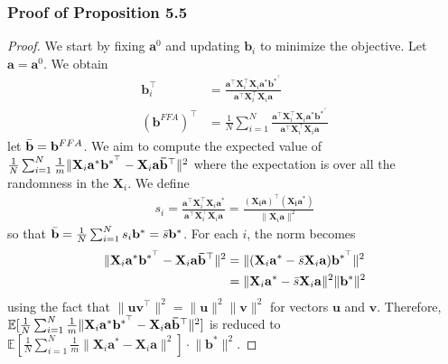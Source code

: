 \documentclass{article}
\theoremstyle{plain}
\theoremstyle{definition}
\theoremstyle{remark}
\begin{document}
\subsubsection{Proof of Proposition 5.5} \label{fa-heter-saturate}
\begin{proof}
    We start by fixing $\mathbf{a}^0$ and updating $\mathbf{b}_i$ to minimize the objective. Let $\mathbf{a}=\mathbf{a}^0$. We obtain
    \begin{align}
        \mathbf{b}_i^\top & = \frac{\mathbf{a}^\top \mathbf{X}_i^\top \mathbf{X}_i \mathbf{a}^* \mathbf{b}^{*^\top} }{\mathbf{a}^\top \mathbf{X}_i^\top\mathbf{X}_i \mathbf{a}} \\
        ({\mathbf{b}}^{FFA})^\top  & = \frac{1}{N} \sum_{i=1}^{N} \frac{\mathbf{a}^\top \mathbf{X}_i^\top \mathbf{X}_i \mathbf{a}^* \mathbf{b}^{*^\top} }{\mathbf{a}^\top \mathbf{X}_i^\top\mathbf{X}_i \mathbf{a}}
    \end{align}
   let $\Bar{\mathbf{b}}={\mathbf{b}}^{FFA}$. We aim to compute the expected value of $\frac{1}{N}\sum_{i=1}^{N}\frac{1}{m}\lVert \mathbf{X}_i \mathbf{a}^*\mathbf{b}^{*^{\top}}- \mathbf{X}_i \mathbf{a}\mathbf{\Bar{b}}^{\top}\rVert^2 $ where the expectation is over all the randomness in the $\mathbf{X}_i$. We define 
    \begin{align}
        s_i = \frac{\mathbf{a}^\top \mathbf{X}_i^\top \mathbf{X}_i \mathbf{a}^* }{\mathbf{a}^\top \mathbf{X}_i^\top\mathbf{X}_i \mathbf{a}}  = \frac{(\mathbf{X_i}\mathbf{a})^\top(\mathbf{X_i}\mathbf{a}^*)}{\lVert \mathbf{X}_i \mathbf{a} \rVert^2}
    \end{align}
    so that $\Bar{\mathbf{b}} = \frac{1}{N}\sum_{i=1}^{N}s_i \mathbf{b}^*=\Bar{s}\mathbf{b}^*$. For each $i$, the norm becomes
    \begin{align}
        \lVert \mathbf{X}_i \mathbf{a}^*\mathbf{b}^{*^{\top}}- \mathbf{X}_i \mathbf{a}\mathbf{\Bar{b}}^{\top}\rVert^2 & = \lVert(\mathbf{X}_i \mathbf{a}^* - \Bar{s}\mathbf{X}_i \mathbf{a}){\mathbf{b}}^{*^\top}\rVert^2 \\
        & = \lVert \mathbf{X}_i \mathbf{a}^* - \Bar{s}\mathbf{X}_i \mathbf{a} \rVert^2 \lVert \mathbf{b}^* \rVert^2
    \end{align}
    using the fact that $\lVert \mathbf{u}\mathbf{v}^\top\rVert^2 = \lVert \mathbf{u}\rVert^2 \lVert \mathbf{v}\rVert^2$ for vectors $\mathbf{u}$ and $\mathbf{v}$. Therefore, $\mathbb{E}[\frac{1}{N}\sum_{i=1}^{N}\frac{1}{m}\lVert \mathbf{X}_i \mathbf{a}^*\mathbf{b}^{*^{\top}}- \mathbf{X}_i \mathbf{a}\mathbf{\Bar{b}}^{\top}\rVert^2] $ is reduced to $\mathbb{E}[\frac{1}{N}\sum_{i=1}^{N}\frac{1}{m}\lVert \mathbf{X}_i \mathbf{a}^*- \mathbf{X}_i \mathbf{a}\rVert^2] \cdot \lVert\mathbf{b}^*\rVert^2$.


\end{proof}
\end{document}
